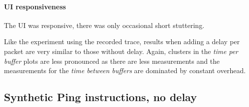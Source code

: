 \paragraph{UI responsiveness}

The UI was responsive, there was only occasional short stuttering.
\bigbreak

Like the experiment using the recorded trace, results when adding a delay per packet are very similar
to those without delay. Again, clusters in the \textit{time per buffer} plots are less pronounced as
there are less measurements and the measurements for the \textit{time between buffers} are dominated
by constant overhead.

\clearpage
\subsection{Synthetic Ping instructions, no delay}
\label{evaluation/results/synthetic-ping-instructions-no-delay}

